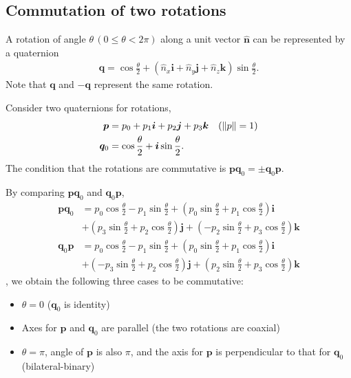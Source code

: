 \subsection{Commutation of two rotations}

A rotation of angle $\theta \, (0 \leq \theta < 2 \pi)$ along a unit vector $\hat{\bm{n}}$ can be represented by a quaternion
\begin{align}
    \bm{q} = \cos \frac{\theta}{2} + (\hat{n}_{x} \bm{i} + \hat{n}_{y} \bm{j} + \hat{n}_{z} \bm{k}) \sin \frac{\theta}{2}.
\end{align}
Note that $\bm{q}$ and $-\bm{q}$ represent the same rotation.

Consider two quaternions for rotations,
\begin{align}
    \bm{p} &= p_{0} + p_{1} \bm{i} + p_{2} \bm{j} + p_{3} \bm{k} \quad (\left\lVert p\right\rVert = 1) \\
    \bm{q}_{0} &= \cos \frac{\theta}{2} + \bm{i} \sin \frac{\theta}{2}.
\end{align}
The condition that the rotations are commutative is $\bm{p}\bm{q}_{0} = \pm \bm{q}_{0} \bm{p}$.

By comparing $\bm{p}\bm{q}_{0}$ and $\bm{q}_{0} \bm{p}$,
\begin{align}
    \bm{p}\bm{q}_{0} &= p_{0} \cos \frac{\theta}{2} - p_{1} \sin \frac{\theta}{2}
                        + \left( p_{0} \sin \frac{\theta}{2} + p_{1} \cos \frac{\theta}{2} \right) \bm{i} \nonumber \\
                        &+ \left( p_{3} \sin \frac{\theta}{2} + p_{2} \cos \frac{\theta}{2} \right) \bm{j}
                        + \left( -p_{2} \sin \frac{\theta}{2} + p_{3} \cos \frac{\theta}{2} \right) \bm{k} \\
    \bm{q}_{0}\bm{p} &= p_{0} \cos \frac{\theta}{2} - p_{1} \sin \frac{\theta}{2}
                        + \left( p_{0} \sin \frac{\theta}{2} + p_{1} \cos \frac{\theta}{2} \right) \bm{i} \nonumber \\
                        &+ \left( -p_{3} \sin \frac{\theta}{2} + p_{2} \cos \frac{\theta}{2} \right) \bm{j}
                        + \left( p_{2} \sin \frac{\theta}{2} + p_{3} \cos \frac{\theta}{2} \right) \bm{k}
\end{align},
we obtain the following three cases to be commutative:
\begin{itemize}
    \item $\theta = 0$ ($\bm{q}_{0}$ is identity)
    \item Axes for $\bm{p}$ and $\bm{q}_{0}$ are parallel (the two rotations are coaxial)
    \item $\theta = \pi$, angle of $\bm{p}$ is also $\pi$, and the axis for $\bm{p}$ is perpendicular to that for $\bm{q}_{0}$ (bilateral-binary)
\end{itemize}

